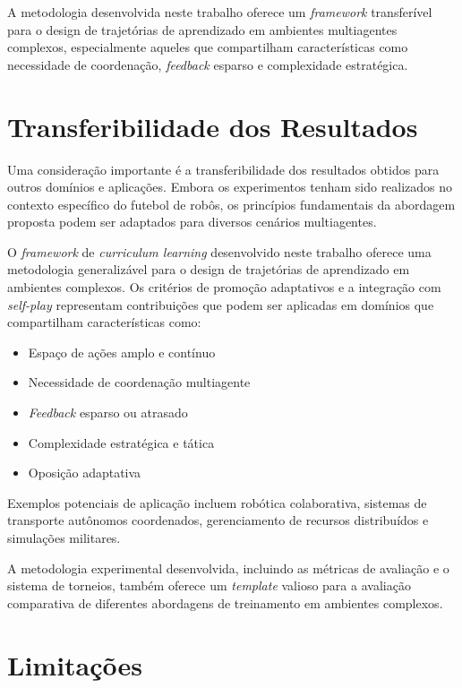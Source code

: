 A metodologia desenvolvida neste trabalho oferece um \textit{framework} transferível para o design de trajetórias de aprendizado em ambientes multiagentes complexos, especialmente aqueles que compartilham características como necessidade de coordenação, \textit{feedback} esparso e complexidade estratégica.

\section{Transferibilidade dos Resultados}

Uma consideração importante é a transferibilidade dos resultados obtidos para outros domínios e aplicações. Embora os experimentos tenham sido realizados no contexto específico do futebol de robôs, os princípios fundamentais da abordagem proposta podem ser adaptados para diversos cenários multiagentes.

O \textit{framework} de \textit{curriculum learning} desenvolvido neste trabalho oferece uma metodologia generalizável para o design de trajetórias de aprendizado em ambientes complexos. Os critérios de promoção adaptativos e a integração com \textit{self-play} representam contribuições que podem ser aplicadas em domínios que compartilham características como:

\begin{itemize}
    \item Espaço de ações amplo e contínuo
    \item Necessidade de coordenação multiagente
    \item \textit{Feedback} esparso ou atrasado
    \item Complexidade estratégica e tática
    \item Oposição adaptativa
\end{itemize}

Exemplos potenciais de aplicação incluem robótica colaborativa, sistemas de transporte autônomos coordenados, gerenciamento de recursos distribuídos e simulações militares.

A metodologia experimental desenvolvida, incluindo as métricas de avaliação e o sistema de torneios, também oferece um \textit{template} valioso para a avaliação comparativa de diferentes abordagens de treinamento em ambientes complexos.

\section{Limitações}


